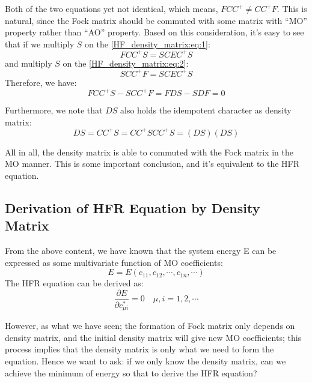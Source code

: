 Both of the two equations yet not identical, which means, $FCC^{+} \neq
CC^{+}F$. This is natural, since the Fock matrix should be commuted with 
some matrix with ``MO'' property rather than ``AO'' property. Based on this 
consideration, it's easy to see that if we multiply $S$ on the 
\ref{HF_density_matrix:eq:1}:
\begin{equation}
\label{HF_density_matrix:eq:3}
FCC^{+}S = SCEC^{+}S 
\end{equation}
and multiply $S$ on the \ref{HF_density_matrix:eq:2}:
\begin{equation}
\label{HF_density_matrix:eq:4}
SCC^{+}F = SCEC^{+}S 
\end{equation}
Therefore, we have:
\begin{equation}
\label{HF_density_matrix:eq:5}
FCC^{+}S - SCC^{+}F = FDS - SDF = 0
\end{equation}

Furthermore, we note that $DS$ also holds the idempotent character as density matrix:
\begin{equation}
 \label{HF_density_matrix:eq:6}
 DS = CC^{+}S = CC^{+}SCC^{+}S = (DS)(DS)
\end{equation}

All in all, the density matrix is able to commuted with the Fock matrix in the 
MO manner. This is some important conclusion, and it's equivalent to the HFR
equation.

\subsection{Derivation of HFR Equation by Density Matrix}
%
%
From the above content, we have known that the system energy E can be expressed as
some multivariate function of MO coefficients:
\begin{equation}
 E = E (c_{11}, c_{12}, \cdots, c_{1n}, \cdots)
\end{equation}
The HFR equation can be derived as:
\begin{equation}
 \frac{\partial E}{\partial c^{*}_{\mu i}} = 0 \quad \mu, i = 1, 2, \cdots
\end{equation}

However, as what we have seen; the formation of Fock matrix only depends on
density matrix, and the initial density matrix will give new MO coefficients;
this process implies that the density matrix is only what we need to form the
equation. Hence we want to ask: if we only know the density matrix, can we
achieve the minimum of energy so that to derive the HFR equation?

